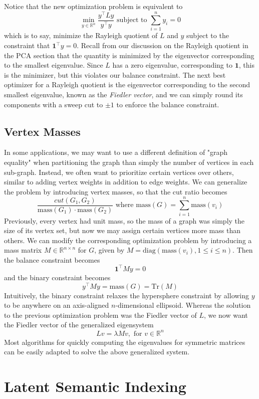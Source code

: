 \documentclass{article}
\begin{document}
Notice that the new optimization problem is equivalent to
$$ \min_{y \in \mathbb{R}^n} \frac{y^\intercal L y}{y^\intercal y} \text{ subject to } \sum_{i = 1}^n y_i = 0 $$
which is to say, minimize the Rayleigh quotient of $ L $ and $ y $ subject to the constraint that $ \mathbf{1}^\intercal y = 0 $. Recall from our discussion on the Rayleigh quotient in the PCA section that the quantity is minimized by the eigenvector corresponding to the smallest eigenvalue. Since $ L $ has a zero eigenvalue, corresponding to $ \mathbf{1} $, this is the minimizer, but this violates our balance constraint. The next best optimizer for a Rayleigh quotient is the eigenvector corresponding to the second smallest eigenvalue, known as the \textit{Fiedler vector}, and we can simply round its components with a sweep cut to $ \pm 1 $ to enforce the balance constraint.

\subsection{Vertex Masses}
In some applications, we may want to use a different definition of "graph equality" when partitioning the graph than simply the number of vertices in each sub-graph. Instead, we often want to prioritize certain vertices over others, similar to adding vertex weights in addition to edge weights. We can generalize the problem by introducing vertex masses, so that the cut ratio becomes
$$ \frac{cut(G_1, G_2)}{\text{mass}(G_1) \cdot \text{mass}(G_2)} \text{ where } \text{mass}(G) = \sum_{i = 1}^n \text{mass}(v_i) $$
Previously, every vertex had unit mass, so the mass of a graph was simply the size of its vertex set, but now we may assign certain vertices more mass than others. We can modify the corresponding optimization problem by introducing a mass matrix $ M \in \mathbb{R}^{n \times n} $ for $ G $, given by $ M = \text{diag}(\text{mass}(v_i), 1 \leq i \leq n) $. Then the balance constraint becomes
$$ \mathbf{1}^\intercal M y = 0 $$
and the binary constraint becomes
$$ y^\intercal M y = \text{mass}(G) = \text{Tr}(M) $$
Intuitively, the binary constraint relaxes the hypersphere constraint by allowing $ y $ to be anywhere on an axis-aligned $ n $-dimensional ellipsoid. Whereas the solution to the previous optimization problem was the Fiedler vector of $ L $, we now want the Fiedler vector of the generalized eigensystem
$$ L v = \lambda M v, \text{ for } v \in \mathbb{R}^n $$
Most algorithms for quickly computing the eigenvalues for symmetric matrices can be easily adapted to solve the above generalized system.

\section{Latent Semantic Indexing}
\end{document}
